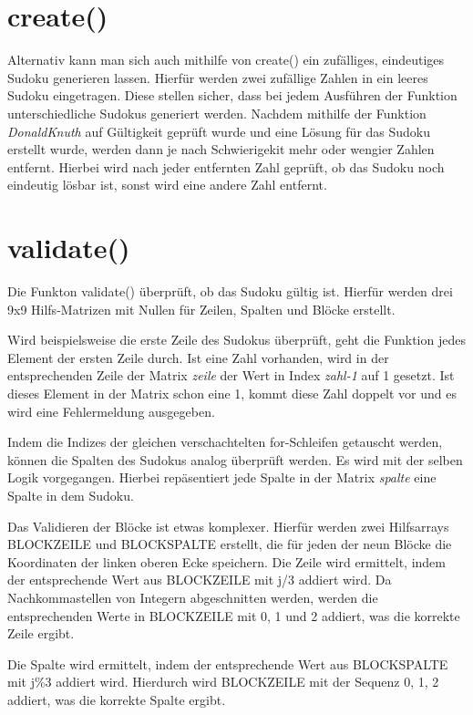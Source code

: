 \documentclass[a4paper,10pt]{article}
\begin{document}
\section{create()}

Alternativ kann man sich auch mithilfe von create() ein zufälliges, eindeutiges Sudoku generieren lassen. Hierfür werden zwei zufällige Zahlen in ein leeres Sudoku eingetragen. Diese stellen sicher, dass bei jedem Ausführen der Funktion unterschiedliche Sudokus generiert werden. Nachdem mithilfe der Funktion \textit{DonaldKnuth} auf Gültigkeit geprüft wurde und eine Lösung für das Sudoku erstellt wurde, werden dann je nach Schwierigekit mehr oder wengier Zahlen entfernt. Hierbei wird nach jeder entfernten Zahl geprüft, ob das Sudoku noch eindeutig lösbar ist, sonst wird eine andere Zahl entfernt.

\section{validate()}

Die Funkton validate() überprüft, ob das Sudoku gültig ist. Hierfür werden drei 9x9 Hilfs-Matrizen mit Nullen für Zeilen, Spalten und Blöcke erstellt.

Wird beispielsweise die erste Zeile des Sudokus überprüft, geht die Funktion jedes Element der ersten Zeile durch. Ist eine Zahl vorhanden, wird in der entsprechenden Zeile der Matrix \textit{zeile} der Wert in Index \textit{zahl-1} auf 1 gesetzt. Ist dieses Element in der Matrix schon eine 1, kommt diese Zahl doppelt vor und es wird eine Fehlermeldung ausgegeben.

Indem die Indizes der gleichen verschachtelten for-Schleifen getauscht werden, können die Spalten des Sudokus analog überprüft werden. Es wird mit der selben Logik vorgegangen. Hierbei repäsentiert jede Spalte in der Matrix \textit{spalte} eine Spalte in dem Sudoku.

Das Validieren der Blöcke ist etwas komplexer. Hierfür werden zwei Hilfsarrays BLOCKZEILE und BLOCKSPALTE erstellt, die für jeden der neun Blöcke die Koordinaten der linken oberen Ecke speichern. Die Zeile wird ermittelt, indem der entsprechende Wert aus BLOCKZEILE mit j/3 addiert wird. Da Nachkommastellen von Integern abgeschnitten werden, werden die entsprechenden Werte in BLOCKZEILE mit 0, 1 und 2 addiert, was die korrekte Zeile ergibt.

Die Spalte wird ermittelt, indem der entsprechende Wert aus BLOCKSPALTE mit j\%3 addiert wird. Hierdurch wird BLOCKZEILE mit der Sequenz 0, 1, 2 addiert, was die korrekte Spalte ergibt.
\end{document}
